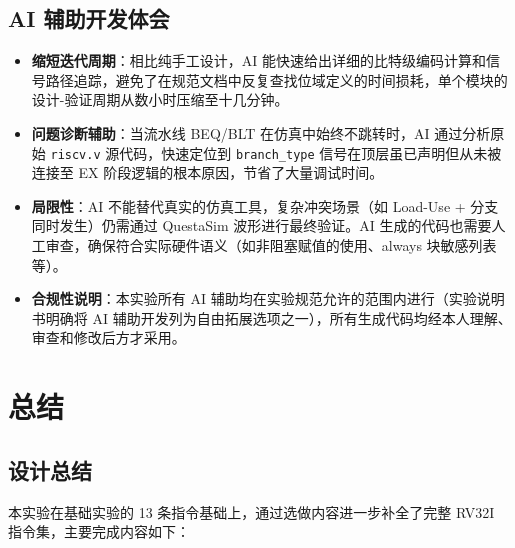 \documentclass[12pt,hyperref,a4paper,UTF8]{ctexart}
\begin{document}
\subsection{AI 辅助开发体会}

\begin{itemize}[leftmargin=2em]
    \item \textbf{缩短迭代周期}：相比纯手工设计，AI 能快速给出详细的比特级编码计算和信号路径追踪，避免了在规范文档中反复查找位域定义的时间损耗，单个模块的设计-验证周期从数小时压缩至十几分钟。

    \item \textbf{问题诊断辅助}：当流水线 BEQ/BLT 在仿真中始终不跳转时，AI 通过分析原始 \texttt{riscv.v} 源代码，快速定位到 \texttt{branch\_type} 信号在顶层虽已声明但从未被连接至 EX 阶段逻辑的根本原因，节省了大量调试时间。

    \item \textbf{局限性}：AI 不能替代真实的仿真工具，复杂冲突场景（如 Load-Use + 分支同时发生）仍需通过 QuestaSim 波形进行最终验证。AI 生成的代码也需要人工审查，确保符合实际硬件语义（如非阻塞赋值的使用、always 块敏感列表等）。

    \item \textbf{合规性说明}：本实验所有 AI 辅助均在实验规范允许的范围内进行（实验说明书明确将 AI 辅助开发列为自由拓展选项之一），所有生成代码均经本人理解、审查和修改后方才采用。
\end{itemize}

\section{总结}

\subsection{设计总结}

本实验在基础实验的 13 条指令基础上，通过选做内容进一步补全了完整 RV32I 指令集，主要完成内容如下：
\end{document}
